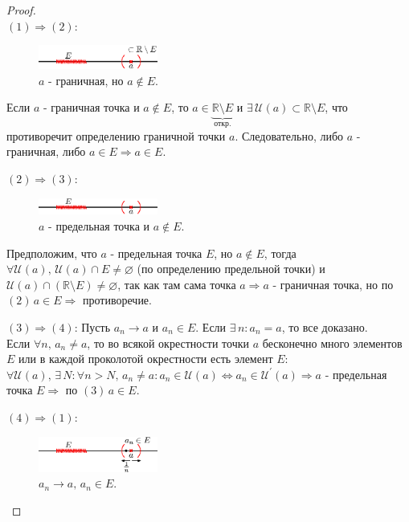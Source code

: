 \documentclass[12pt]{article}
\theoremstyle{definition}
\begin{document}
\begin{proof}\hfill\\
	$(1) \Rightarrow (2)$: 
	
	\begin{figure}[H]
		\centering
		\includegraphics[width=0.35\textwidth]{12_4.eps}
		\caption{$a$ - граничная, но $a \notin E$.}
		\label{12_4}
	\end{figure}

	Если $a$ - граничная точка и $a \notin E$,  то $a \in \underbrace{\mathbb{R} \setminus E}_{\text{откр.}}$ и $\exists \, \mathcal{U}(a) \subset \mathbb{R}\setminus E$, что противоречит определению граничной точки $a$. Следовательно, либо $a$ - граничная, либо $a \in E \Rightarrow a \in E$.
	
	$(2) \Rightarrow (3)$: 
	
	\begin{figure}[H]
		\centering
		\includegraphics[width=0.35\textwidth]{12_5.eps}
		\caption{$a$ - предельная точка и $a \notin E$.}
		\label{12_5}
	\end{figure}
	
	Предположим, что $a$ - предельная точка $E$, но $a \notin E$, тогда $\forall \mathcal{U}(a), \, \mathcal{U}(a) \cap E \neq \varnothing$ (по определению предельной точки) и $\mathcal{U}(a) \cap (\mathbb{R}\setminus E) \neq \varnothing$, так как там сама точка $a \Rightarrow a$ - граничная точка, но по $(2) \, a \in E \Rightarrow$ противоречие.
	
	$(3) \Rightarrow (4)$: Пусть $a_n \to a$ и $a_n \in E$. Если $\exists \, n\colon a_n = a$, то все доказано.\\ 
	Если $\forall n, \, a_n \neq a$, то во всякой окрестности точки $a$ бесконечно много элементов $E$ или в каждой проколотой окрестности есть элемент $E$: $\forall \mathcal{U}(a), \, \exists \, N \colon \forall n > N, \, a_n \neq a \colon a_n \in \mathcal{U}(a) \Leftrightarrow a_n \in \mathcal{U}^\prime(a) \Rightarrow a$ - предельная точка $E \Rightarrow$ по $(3) \, a\in E$.
	
	$(4) \Rightarrow (1)$:
	\begin{figure}[H]
		\centering
		\includegraphics[width=0.35\textwidth]{12_6.eps}
		\caption{$a_n \to a, \, a_n \in E$.}
		\label{12_6}
	\end{figure}
	

\end{proof}
\end{document}
